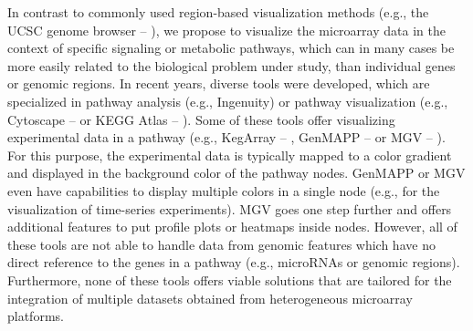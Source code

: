 \documentclass{bioinfo}
\begin{document}
In contrast to commonly used region-based visualization methods (e.g., the UCSC genome browser --
\citealp{UCSCBrowser}), we propose to visualize the microarray data in the context of specific
signaling or metabolic pathways, which can in many cases be more easily related to the biological
problem under study, than individual genes or genomic regions.
%
In recent years, diverse tools were developed, which are specialized in pathway analysis (e.g.,
Ingenuity) or pathway visualization (e.g., Cytoscape -- \citealp{Cytoscape} or KEGG Atlas --
\citealp{KEGGAtlas}). Some of these tools offer visualizing experimental data in a pathway (e.g.,
KegArray -- \citealp{KEGG}, GenMAPP -- \citealp{GenMAPP} or MGV -- \citealp{Symons2011}). For this
purpose, the experimental data is typically mapped to a color gradient and displayed in the
background color of the pathway nodes. GenMAPP or MGV even have capabilities to display multiple
colors in a single node (e.g., for the visualization of time-series experiments). MGV goes one step
further and offers additional features to put profile plots or heatmaps inside nodes. However, all
of these tools are not able to handle data from genomic features which have no direct reference to
the genes in a pathway (e.g., microRNAs or genomic regions). Furthermore, none of these tools offers
viable solutions that are tailored for the integration of multiple datasets obtained from
heterogeneous microarray platforms.

\end{document}

